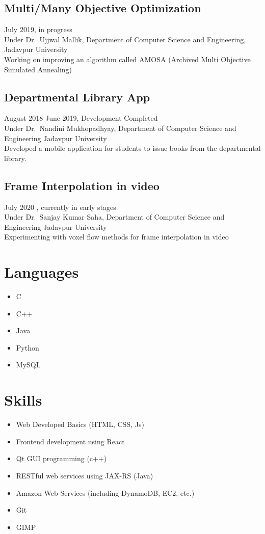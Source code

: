 \documentclass{article}
\begin{document}
\subsection{Multi/Many Objective Optimization}
July 2019, in progress\\
Under Dr.\ Ujjwal Mallik, 
Department of Computer Science and Engineering, 
Jadavpur University\\

Working on improving an algorithm called AMOSA
(Archived Multi Objective Simulated Annealing)

\subsection{Departmental Library App}
August 2018 \- June 2019, Development Completed\\
Under Dr.\ Nandini Mukhopadhyay,
Department of Computer Science and Engineering
Jadavpur University\\

Developed a mobile application for students to issue books from
the departmental library.

\subsection{Frame Interpolation in video}
July 2020 , currently in early stages\\
Under Dr.\ Sanjay Kumar Saha,
Department of Computer Science and Engineering
Jadavpur University\\

Experimenting with voxel flow methods for frame interpolation in video


\section{Languages} 
\begin{itemize}
	\item C
	\item C++
	\item Java
	\item Python
	\item MySQL
\end{itemize}

\section{Skills} 
\begin{itemize}
	\item Web Developed Basics (HTML, CSS, Js)
	\item Frontend development using React
	\item Qt GUI programming (c++)
	\item RESTful web services using JAX-RS (Java)
	\item Amazon Web Services (including DynamoDB, EC2, etc.)
	\item Git
	\item GIMP
\end{itemize}
\end{document}
